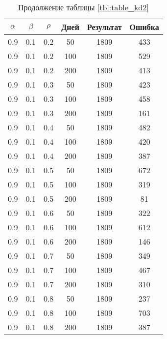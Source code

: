 \begin{table}[h]
	\begin{center}
        \begin{threeparttable}
        \captionsetup{justification=raggedright,singlelinecheck=off}
		\caption*{Продолжение таблицы \ref{tbl:table_kd2}}
		\begin{tabular}{|c|c|c|c|c|c|}
  	\hline
	$\alpha$ & $\beta$ & $\rho$ & Дней & Результат & Ошибка \\\hline
		0.9 &  0.1 &  0.2 &   50 &  1809 &   433 \\
		0.9 &  0.1 &  0.2 &  100 &  1809 &   529 \\
		0.9 &  0.1 &  0.2 &  200 &  1809 &   413 \\
	   \hline
		0.9 &  0.1 &  0.3 &   50 &  1809 &   423 \\
		0.9 &  0.1 &  0.3 &  100 &  1809 &   458 \\
		0.9 &  0.1 &  0.3 &  200 &  1809 &   161 \\
	   \hline
		0.9 &  0.1 &  0.4 &   50 &  1809 &   482 \\
		0.9 &  0.1 &  0.4 &  100 &  1809 &   420 \\
		0.9 &  0.1 &  0.4 &  200 &  1809 &   387 \\
	   \hline
		0.9 &  0.1 &  0.5 &   50 &  1809 &   672 \\
		0.9 &  0.1 &  0.5 &  100 &  1809 &   319 \\
		0.9 &  0.1 &  0.5 &  200 &  1809 &    81 \\
	   \hline
		0.9 &  0.1 &  0.6 &   50 &  1809 &   322 \\
		0.9 &  0.1 &  0.6 &  100 &  1809 &   612 \\
		0.9 &  0.1 &  0.6 &  200 &  1809 &   146 \\
	   \hline
		0.9 &  0.1 &  0.7 &   50 &  1809 &   349 \\
		0.9 &  0.1 &  0.7 &  100 &  1809 &   467 \\
		0.9 &  0.1 &  0.7 &  200 &  1809 &   310 \\
	   \hline
		0.9 &  0.1 &  0.8 &   50 &  1809 &   237 \\
		0.9 &  0.1 &  0.8 &  100 &  1809 &   703 \\
		0.9 &  0.1 &  0.8 &  200 &  1809 &   387 \\
	   \hline
		\end{tabular}
        \end{threeparttable}
	\end{center}
\end{table}